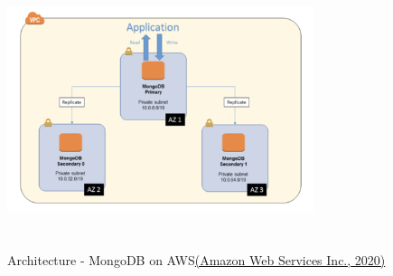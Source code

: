\documentclass[12pt]{article}
\begin{document}
\\
\begin{figure}
  \centering
  \includegraphics[width=0.8\textwidth, height=80mm]{img/architecture.png}
  \caption{Architecture - MongoDB on AWS\hyperref[sec:reference]{(Amazon Web Services Inc., 2020)}}
  \label{fig:architecture}
\end{figure}
\end{document}
